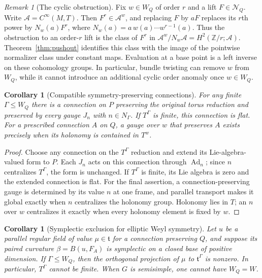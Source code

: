 \documentclass[11pt]{amsart}
\newcommand{\Ad}{\operatorname{Ad}}
\theoremstyle{plain}
\newtheorem{corollary}[theorem]{Corollary}
\theoremstyle{definition}
\theoremstyle{remark}
\newtheorem{remark}[theorem]{Remark}
\begin{document}
\begin{remark}[The cyclic obstruction]\label{rem:norm}
Fix $w\in W_Q$ of order $r$ and a lift $F\in\mathcal N_Q$. Write $\mathcal A=C^\infty(M,T)$. Then $F^r\in\mathcal A^w$, and replacing $F$ by $aF$ replaces its $r$th power by $N_w(a)F^r$, where $N_w(a)=a\,w(a)\cdots w^{r-1}(a)$. Thus the obstruction to an order-$r$ lift is the class of $F^r$ in $\mathcal A^w/N_w\mathcal A=H^2(\mathbb Z/r;\mathcal A)$. Theorem~\ref{thm:pushout} identifies this class with the image of the pointwise normalizer class under constant maps. Evaluation at a base point is a left inverse on these cohomology groups. In particular, bundle twisting can remove $w$ from $W_Q$, while it cannot introduce an additional cyclic order anomaly once $w\in W_Q$.
\end{remark}

\begin{corollary}[Compatible symmetry-preserving connections]\label{cor:connection}
For any finite $\Gamma\leq W_Q$ there is a connection on $P$ preserving the original torus reduction and preserved by every gauge $J_n$ with $n\in N_\Gamma$. If $T^\Gamma$ is finite, this connection is flat. For a prescribed connection $A$ on $Q$, a gauge over $w$ that preserves $A$ exists precisely when its holonomy is contained in $T^w$.
\end{corollary}

\begin{proof}
Choose any connection on the $T^\Gamma$ reduction and extend its Lie-algebra-valued form to $P$. Each $J_n$ acts on this connection through $\Ad_n$; since $n$ centralizes $T^\Gamma$, the form is unchanged. If $T^\Gamma$ is finite, its Lie algebra is zero and the extended connection is flat. For the final assertion, a connection-preserving gauge is determined by its value $n$ at one frame, and parallel transport makes it global exactly when $n$ centralizes the holonomy group. Holonomy lies in $T$; an $n$ over $w$ centralizes it exactly when every holonomy element is fixed by $w$.
\end{proof}

\begin{corollary}[Symplectic exclusion for elliptic Weyl symmetry]\label{cor:elliptic}
Let $u$ be a parallel regular field of value $\mu\in\mathfrak t$ for a
connection preserving $Q$, and suppose its paired curvature
$\beta=B(u,F_A)$ is symplectic on a closed base of positive dimension.
If $\Gamma\leq W_Q$, then the orthogonal projection of $\mu$ to
$\mathfrak t^\Gamma$ is nonzero. In particular, $T^\Gamma$ cannot be
finite. When $G$ is semisimple, one cannot have $W_Q=W$.
\end{corollary}
\end{document}
